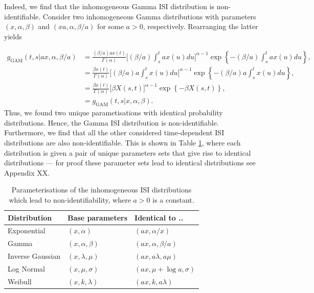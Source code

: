 \documentclass[oneside, 12 pt]{book}
\begin{document}
Indeed, we find that the inhomogeneous Gamma ISI distribution is non-identifiable. 
Consider two inhomogeneous Gamma distributions with parameters $(x,\alpha,\beta)$ and $(xa, \alpha, \beta/a)$ for some $a>0$, respectively. Rearranging the latter yields

 \begin{align*}
 g_{\mathrm{GAM}}(t,s|ax, \alpha, \beta/a) &=  \frac{(\beta/a) ax(t)}{\Gamma ( \alpha )} \big[ (\beta/a) \int^t_s a x(u) du \big]^{\alpha -1} \exp\left\{ - (\beta/a) \int^t_s a x(u) du  \right\}, \\
 &=  \frac{\beta x(t)}{\Gamma ( \alpha )} \big[ (\beta/a) a\int^{t}_{s}  x(u) du \big]^{\alpha -1} \exp \left\{ - (\beta/a) a\int^{t}_{s}  x(u) du  \right\}, \\
  &=  \frac{\beta x(t)}{\Gamma ( \alpha )} \big[ \beta X(s,t) \big]^{\alpha -1} \exp\left\{ - \beta X(s,t)  \right\},\\
  &= g_{\mathrm{GAM}}(t,s|x, \alpha, \beta).
 \end{align*}
Thus, we found two unique parametisations with identical probability distributions. Hence, the Gamma ISI distribution is non-identifiable. Furthermore, we find that all the other considered time-dependent ISI distributions are also non-identifiable. This is shown in Table \ref{table:Non-ident}, where each distribution is given a pair of unique parameters sets that give rise to identical distributions --- for proof these parameter sets lead to identical distributions see Appendix {\color{red} XX}. 


\begin{table}[h!]
  \begin{center}
    \begin{tabular}{|l|l|l|}
    \hline
     Distribution & Base parameters & Identical to ..  \\ \hline
     Exponential & $(x,\alpha)$ & $(ax, \alpha/x)$ \\
     Gamma & $(x, \alpha, \beta)$ & $(a x, \alpha, \beta/a)$ \\
     Inverse Gaussian & $(x,\lambda,\mu)$ & $(a x, a\lambda, a \mu)$ \\
     Log Normal & $(x,\mu, \sigma)$ & $(a x, \mu + \log a, \sigma )$ \\
     Weibull & $(x, k, \lambda)$ & $(a x, k, a \lambda)$\\ \hline
    \end{tabular}
    \caption{Parameterisations of the inhomogeneous ISI distributions which lead to non-identifiability, where $a>0$ is a constant. }
    \label{table:Non-ident}
  \end{center}
\end{table} 
\end{document}
